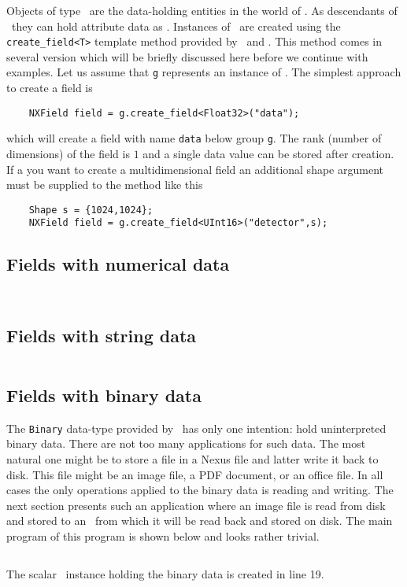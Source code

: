 
Objects of type \nxfield\ are the data-holding entities in the world of \pninx.
As descendants of \nxobject\ they can hold attribute data as \nxgroup. 
Instances of \nxfield\ are created using the {\tt create\_field<T>} template
method provided by \nxfile\ and \nxgroup. 
This method comes in several version which will be briefly discussed here before
we continue with examples. 
Let us assume that  {\tt g} represents an instance of \nxgroup. The simplest 
approach to create a field is
\begin{verbatim}
    NXField field = g.create_field<Float32>("data");
\end{verbatim}
which will create a field with name {\tt data} below group {\tt g}. The rank
(number of dimensions) of the field is $1$ and a single data value can be stored
after creation. If a you want to create a multidimensional field an additional
shape argument must be supplied to the method like this
\begin{verbatim}
    Shape s = {1024,1024};
    NXField field = g.create_field<UInt16>("detector",s);
\end{verbatim}


\subsection{Fields with numerical data}
\label{section:nxfield_numeric_io}

\inputminted[linenos=true]{c++}{../examples/c++/nxnumfield_ex1.cpp}
\inputminted[linenos=true]{c++}{../examples/c++/nxnumfield_ex2.cpp}

\subsection{Fields with string data}
\label{section:nxfield_string_io}

\inputminted[linenos=true]{c++}{../examples/c++/nxstrfield_ex2.cpp}

\subsection{Fields with binary data}
\label{section:nxfield_binary_io}
The {\tt Binary} data-type provided by \pniutils\ has only one intention: hold
uninterpreted binary data. There are not too many applications for such data.
The most natural one might be to store a file in a Nexus file and latter write
it back to disk. This file might be an image file, a PDF document, or an office
file. In all cases the only operations applied to the binary data is reading and
writing. 
The next section presents such an application where an image file is read from
disk and stored to an \nxfield\ from which it will be read back and stored on
disk.
The main program of this program is shown below and looks rather trivial.
\inputminted[linenos,firstline=1,lastline=24]{c++}{../examples/c++/nxbinfield_ex1.cpp}
The scalar \nxfield\ instance holding the binary data is created in line 19.

\inputminted[linenos,firstnumber=27,firstline=27,lastline=44]{c++}{../examples/c++/nxbinfield_ex1.cpp}
\inputminted[linenos,firstnumber=47,firstline=47,lastline=56]{c++}{../examples/c++/nxbinfield_ex1.cpp}
